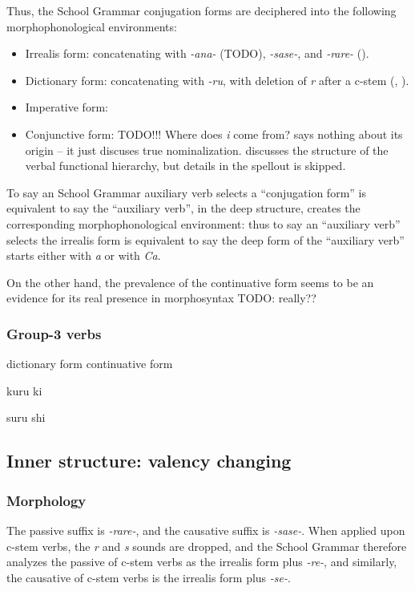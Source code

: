 \documentclass[UTF8, a4paper, oneside, scheme=plain]{ctexart}
\newcommand{\corpus}[1]{\emph{#1}}
\begin{document}
Thus, the School Grammar conjugation forms are deciphered 
into the following morphophonological environments:
\begin{itemize}
    \item Irrealis form: concatenating with \corpus{-ana-} (TODO), 
    \corpus{-sase-}, and \corpus{-rare-} (). 
    \item Dictionary form: concatenating with \corpus{-ru},
    with deletion of \corpus{r} after a c-stem (, ).
    \item Imperative form:
    \item Conjunctive form: TODO!!! Where does \corpus{i} come from?
    \citet{volpe2005japanese} says nothing about its origin -- 
    it just discuses true nominalization.
    \citet{fukuda2012aspectual} discusses the structure of the verbal functional hierarchy,
    but details in the spellout is skipped.
\end{itemize}
To say an School Grammar auxiliary verb selects a ``conjugation form''
is equivalent to say the ``auxiliary verb'', in the deep structure,
creates the corresponding morphophonological environment:
thus to say an ``auxiliary verb'' selects the irrealis form 
is equivalent to say the deep form of the ``auxiliary verb'' 
starts either with \corpus{a} or with \corpus{Ca}.

On the other hand, the prevalence of the continuative form seems to be an evidence 
for its real presence in morphosyntax TODO: really??

\subsubsection{Group-3 verbs}

dictionary form continuative form 

kuru ki 

suru shi

\subsection{Inner structure: valency changing}\label{sec:valency-changing}

\subsubsection{Morphology}\label{sec:valency-changing-form}

The passive suffix is \corpus{-rare-},
and the causative suffix is \corpus{-sase-}.
When applied upon c-stem verbs,
the \corpus{r} and \corpus{s} sounds are dropped,
and the School Grammar therefore analyzes 
the passive of c-stem verbs as the irrealis form plus \corpus{-re-},
and similarly,
the causative of c-stem verbs is the irrealis form plus \corpus{-se-}.
\end{document}
